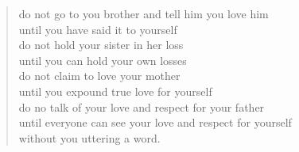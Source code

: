 \begin{verse}
do not go to you brother and tell him you love him\\
  until you have said it to yourself\\
do not hold your sister in her loss\\
  until you can hold your own losses\\
do not claim to love your mother\\
  until you expound true love for yourself\\
do no talk of your love and respect for your father\\
  until everyone can see your love and respect for yourself\\
    without you uttering a word.
\end{verse}
